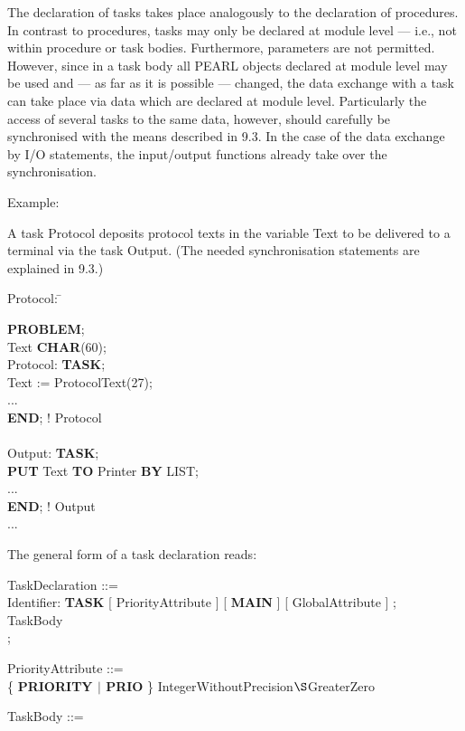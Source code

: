 The declaration of tasks takes place analogously to the declaration of
procedures. In contrast to procedures, tasks may only be declared at
module level --- i.e., not within procedure or task bodies. Furthermore,
parameters are not permitted. However, since in a task body all PEARL
objects declared at module level may be used and --- as far as it is
possible --- changed, the data exchange with a task can take place via
data which are declared at module level. Particularly the access of
several tasks to the same data, however, should carefully be
synchronised with the means described in 9.3. In the case of the data 
exchange by I/O statements, the input/output functions
already take over the synchronisation.

Example:

A task Protocol deposits protocol texts in the variable Text to be
delivered to a terminal via the task Output. (The needed synchronisation
statements are explained in 9.3.)

\begin{tabbing}
\x Protocol: \= \kill

{\bf PROBLEM}; \> \\
 Text {\bf CHAR}(60); \> \\
\x Protocol: \> {\bf TASK}; \\
      \> Text := ProtocolText(27);\\
      \> ... \\
      \> {\bf END}; ! Protocol \\
      \> \\
\x Output:   \> {\bf TASK}; \\
      \> {\bf PUT} Text {\bf TO} Printer {\bf BY} LIST;\\
      \> ... \\
      \> {\bf END}; ! Output\\
\x ...       \>
\end{tabbing}

The general form of a task declaration reads:

TaskDeclaration ::=\\
\x Identifier: {\bf TASK} [ PriorityAttribute ] [ {\bf MAIN} ] [ GlobalAttribute ] ;\\
\x TaskBody \\
;

PriorityAttribute ::= \\
\x \{ {\bf PRIORITY $\mid$ PRIO} \} IntegerWithoutPrecision$\S $GreaterZero

TaskBody ::= \\
\x [ Declaration$^{...}$ ] [ Statement$^{...}$ ]

